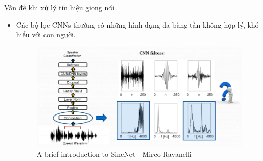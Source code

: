 \documentclass[11pt]{beamer}
\begin{document}
\begin{frame}{Vấn đề khi xử lý tín hiệu giọng nói}
	\begin{itemize}
		\item Các bộ lọc CNNs thường có những hình dạng đa băng tần không hợp lý, khó hiểu với con người.
		\begin{figure}[H]
			\includegraphics[width=0.9\linewidth]{images/interpretability_problems.png}
			\caption{A brief introduction to SincNet - Mirco Ravanelli}
			\label{fig:writing-thesis}
		\end{figure}
	\end{itemize}
\end{frame}
\end{document}
